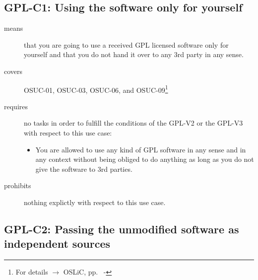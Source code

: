 \subsection{GPL-C1: Using the software only for yourself}
\label{OSUC-01-GPL} \label{OSUC-03-GPL}
\label{OSUC-06-GPL} \label{OSUC-09-GPL}

\begin{description}

\item[means] that you are going to use a received GPL licensed software only
for yourself and that you do not hand it over to any 3rd party in any sense.

\item[covers] OSUC-01, OSUC-03, OSUC-06, and OSUC-09\footnote{For details
$\rightarrow$ OSLiC, pp.\ \pageref{OSUC-01-DEF} - \pageref{OSUC-09-DEF}}

\item[requires] no tasks in order to fulfill the conditions of the GPL-V2 or
the GPL-V3 with respect to this use case:
  \begin{itemize}
    \item You are allowed to use any kind of GPL software in any sense and in
    any context without being obliged to do anything as long as you do not
    give the software to 3rd parties.
  \end{itemize}

\item[prohibits] nothing explictly with respect to this use case.
\end{description}


\subsection{GPL-C2: Passing the unmodified software as independent sources}
\label{OSUC-02S-GPL} \label{OSUC-05S-GPL}

